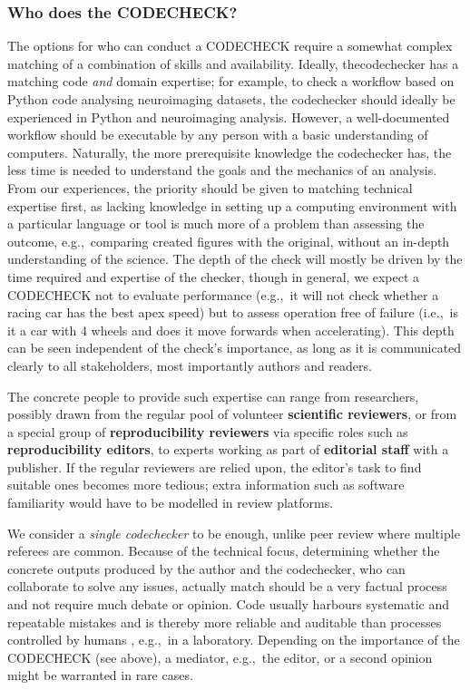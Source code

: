 \documentclass[12pt]{article}
\begin{document}
\subsubsection*{Who does the CODECHECK?}\label{who-does-the-codecheck}

The options for who can conduct a CODECHECK require a somewhat complex matching of a combination of skills and availability.
Ideally, thecodechecker has a matching code \emph{and} domain expertise; for example, to check a workflow based on Python code analysing neuroimaging datasets, the codechecker should ideally be experienced in Python and neuroimaging analysis.
However,
a well-documented workflow should be executable by any person with a basic
understanding of computers. Naturally, the more prerequisite knowledge the
codechecker has, the less time is needed to understand the goals and 
the mechanics of an analysis.
From our experiences, the priority should be given to matching technical expertise first, as lacking knowledge in setting up a computing environment with a particular language or tool is much more of a problem than assessing the outcome, e.g.,~comparing created figures with the original, without an in-depth understanding of the science.
The depth of the check will mostly be driven by the time required and expertise of the checker, though in general, we expect a CODECHECK not to evaluate performance (e.g.,~it will not check whether a racing car has the best apex speed) but to assess operation free of failure (i.e.,~is it a car with 4 wheels and does it move forwards when accelerating).
This depth can be seen independent of the check's importance, as long as it is communicated clearly to all stakeholders, most importantly authors and readers.

The concrete people to provide such expertise can range from researchers,
possibly drawn from the regular pool of volunteer
\textbf{scientific reviewers}, or from a special group of
\textbf{reproducibility reviewers} via specific roles
such as \textbf{reproducibility editors}, to experts working as part of
\textbf{editorial staff} with a publisher. If the regular reviewers
are relied upon, the editor's task to find suitable ones becomes more
tedious; extra information such as software familiarity would have to be
modelled in review platforms.

We consider a \emph{single codechecker} to be enough, unlike peer review where
multiple referees are common.
Because of the technical focus, determining whether the concrete outputs produced by the author and the codechecker, who can collaborate to solve any issues, actually match should be a very factual process and not require much debate or opinion.
Code usually harbours systematic and repeatable mistakes and is thereby more reliable and auditable than processes controlled by humans \cite{tibav:42484}, e.g.,~in a laboratory.
Depending on the importance of the CODECHECK
(see above), a mediator, e.g.,~the editor, or a
second opinion might be warranted in rare cases.
\end{document}
